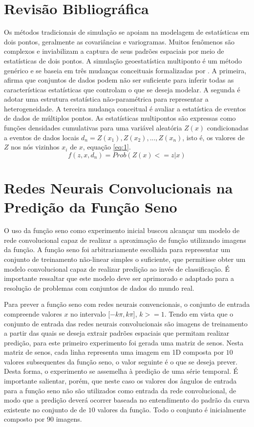 \documentclass[11pt]{article}
\begin{document}
\section{Revisão Bibliográfica}

Os métodos tradicionais de simulação se apoiam na modelagem de estatísticas em dois pontos, geralmente as covariâncias e variogramas. Muitos
fenômenos são complexos e inviabilizam a captura de seus padrões espaciais por meio de estatísticas de dois pontos. A simulação
geoestatística multiponto é um método genérico e se
baseia em três mudanças conceituais formalizadas por \cite{Guardiano1993}. A primeira, afirma que conjuntos de dados podem não ser suficiente
para inferir todas as características estatísticas que controlam o que se deseja modelar. A segunda é adotar uma estrutura estatística
não-paramétrica para representar a heterogeneidade. A terceira mudança conceitual é avaliar a estatística de eventos de dados de múltiplos
pontos. As estatísticas multipontos são expressas como funções densidades cumulativas para uma variável aleatória $Z(x)$ condicionadas
a eventos de dados locais $d_n =  {Z(x_1), Z(x_2),...,Z(x_n)}$, isto é, os valores de $Z$ nos nós vizinhos $x_i$ de $x$, equação \ref{eq:1}.
\begin{equation}
 f(z, x, d_n) = Prob({Z(x)<=z|x})
 \label{eq:1}
\end{equation}


\section{Redes Neurais Convolucionais na Predição da Função Seno}

O uso da função seno como experimento inicial buscou alcançar um modelo de
rede convolucional capaz de realizar a aproximação de função utilizando
imagens da função. A função seno foi arbitrariamente escolhida para
representar um conjunto de treinamento não-linear simples o
suficiente, que permitisse obter um modelo convolucional capaz de realizar predição
ao invés de classificação. É importante ressaltar que este modelo deve ser
aprimorado e adaptado para a resolução de problemas com conjuntos de dados
do mundo real.

Para prever a função seno com redes neurais convencionais, o
conjunto de entrada compreende valores $x$ no intervalo [$-k\pi,k\pi$],
$k >= 1$. Tendo em vista que o conjunto de entrada das redes neurais convolucionais
são imagens de treinamento a partir das quais se deseja extrair padrões espaciais
que permitam realizar predição, para este primeiro experimento foi gerada uma
matriz de senos. Nesta matriz de senos, cada linha representa uma imagem em 1D
composta por $10$ valores subsequentes da função seno, o valor seguinte é o que se
deseja prever. Desta forma, o experimento se assemelha à predição de uma série temporal.
É importante salientar, porém, que neste caso os valores dos ângulos de entrada para a função
seno não são utilizados como entrada da rede convolucional, de modo que a predição
deverá ocorrer baseada no entendimento do padrão da curva existente no conjunto de
de $10$ valores da função. Todo o conjunto é inicialmente composto por $90$ imagens.
\end{document}
